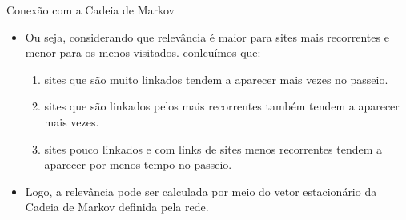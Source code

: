 \documentclass{beamer}
\begin{document}
\begin{frame}{Conexão com a Cadeia de Markov}
\begin{itemize}

\item Ou seja, considerando que relevância é maior para sites mais recorrentes e menor para os menos visitados. conlcuímos que:

\vspace{5pt}

\begin{enumerate}
    \item sites que são muito linkados tendem a aparecer mais vezes no passeio.
    \item sites que são linkados pelos mais recorrentes também tendem a aparecer mais vezes.
    \item sites pouco linkados e com links de sites menos recorrentes tendem a aparecer por menos tempo no passeio.
\end{enumerate}

\vspace{5pt}


\vspace{2pt}

\item Logo, a relevância pode ser calculada por meio do vetor estacionário da Cadeia de Markov definida pela rede.

\end{itemize}
\end{frame}
\end{document}
